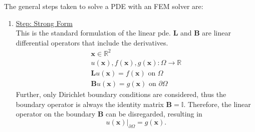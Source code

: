 \documentclass[./\jobname.tex]{subfiles}
\begin{document}
The general steps taken to solve a PDE with an FEM solver are: 
\begin{enumerate}
	\item \underline{Step: Strong Form} \\
		  This is the standard formulation of the linear \gls{pde}. $\mathbf{L}$ and $\mathbf{B}$ are linear differential operators that include the derivatives. \\
		  \begin{equation}
		  \label{eq: strong form}
			  \begin{split}
			  	\mathbf{x} \in \mathbb{R}^2 \\
			  	u(\mathbf{x}), f(\mathbf{x}), g(\mathbf{x}): \Omega \rightarrow \mathbb{R} \\
				\mathbf{L} u(\mathbf{x}) = f(\mathbf{x}) \text{ on $\Omega$} \\
				\mathbf{B} u(\mathbf{x}) = g(\mathbf{x}) \text{ on $\partial \Omega$}
			  \end{split}
		  \end{equation}
		  Further, only Dirichlet boundary conditions are considered, thus the boundary operator is always the identity matrix $\mathbf{B} = \mathbb{I}$. Therefore, the linear operator on the boundary $\mathbf{B}$ can be disregarded, resulting in  \\
		  \begin{equation}
		  	u(\mathbf{x})|_{\partial \Omega} = g(\mathbf{x}) .
		  \end{equation}
		  

\end{enumerate}
\end{document}
